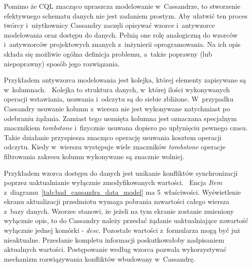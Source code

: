 Pomimo że CQL znacząco upraszcza modelowanie w~Cassandrze, to stworzenie efektywnego schematu danych nie jest zadaniem prostym. Aby ułatwić ten proces twórcy i~użytkownicy Cassandry zaczęli opisywać wzorce i~antywzorce modelowania oraz dostępu do danych. Pełnią one rolę analogiczną do wzorców i~antywzorców projektowych znanych z~inżynierii oprogramowania. Na ich opis składa się możliwie ogólna definicja problemu, a~także poprawny (lub niepoprawny) sposób jego rozwiązania. 

Przykładem antywzorca modelowania jest kolejka, której elementy zapisywane są w~kolumnach.~\cite{cassandra_queue_antipattern} Kolejka to struktura danych, w~której ilości wykonywanych operacji wstawiania, usuwania i~odczytu są do siebie zbliżone. W~przypadku Cassandry usuwanie kolumn z~wiersza nie jest wykonywane natychmiast po odebraniu żądania. Zamiast tego usunięta kolumna jest oznaczana specjalnym znacznikiem \emph{tombstone} i~fizycznie usuwana dopiero po upłynięciu pewnego czasu. Takie działanie przyspiesza znacząco operację usuwania kosztem operacji odczytu. Kiedy w~wierszu występuje wiele znaczników \emph{tombstone} operacje filtrowania zakresu kolumn wykonywane są znacznie wolniej.

Przykładem wzorca dostępu do danych jest unikanie konfliktów synchronizacji poprzez uaktualnianie wyłącznie zmodyfikowanych wartości.~\cite{cassandra_concepts_patterns_antipatterns} Encja \emph{Item} z~diagramu~\ref{tab:bad_cassandra_data_model} ma 5~właściwości. Wyświetlenie ekranu aktualizacji przedmiotu wymaga pobrania zawartości całego wiersza z~bazy danych. Wzorzec stanowi, że jeżeli na tym ekranie zostanie zmieniony wyłącznie opis, to do Cassandry należy przesłać żądanie uaktualniające zawartość wyłącznie jednej komórki - \emph{desc}. Pozostałe wartości z~formularza mogą być już nieaktualne. Przesłanie kompletu informacji poskutkowałoby nadpisaniem aktualnych wartości. Postępowanie według wzorca pozwala wykorzystywać mechanizm rozwiązywania konfliktów wbudowany w~Cassandrę.

